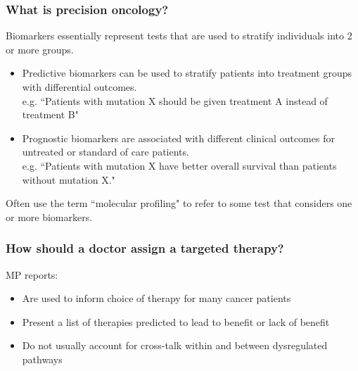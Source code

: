 \documentclass{beamer}
\begin{document}
\begin{frame}[noframenumbering]
\frametitle{What is precision oncology?}

Biomarkers essentially represent tests that are used to stratify individuals into 2 or more groups.

\begin{itemize}
\item {\color{red}Predictive biomarkers} can be used to stratify patients into treatment groups with differential outcomes.\\
e.g. ``Patients with mutation X should be given treatment A instead of treatment B"
\item {\color{red}Prognostic biomarkers} are associated with different clinical outcomes for untreated or standard of care patients.\\
e.g. ``Patients with mutation X have better overall survival than patients without mutation X."
\end{itemize}

\vspace{0.6cm}

Often use the term {\color{red}``molecular profiling"} to refer to some test that considers one or more biomarkers.

\end{frame}


\begin{frame}[noframenumbering]
\frametitle{How should a doctor assign a targeted therapy?}

MP reports:

\begin{itemize}
\item Are used to inform choice of therapy for many cancer patients
\item Present a list of therapies predicted to lead to benefit or lack of benefit
\item Do not usually account for cross-talk within and between dysregulated pathways
\end{itemize}

\end{frame}

\end{document}
